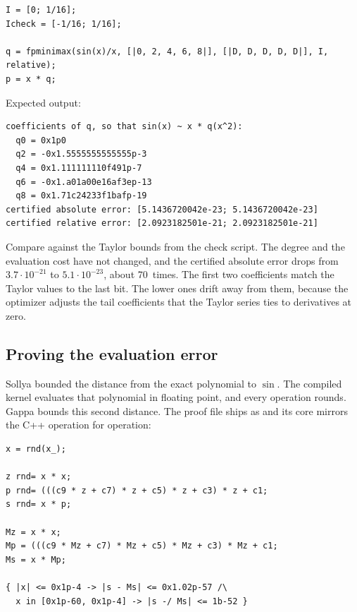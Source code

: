 \documentclass[manuscript, nonacm]{acmart}
\begin{document}
    \begin{lstlisting}[style=sollya]
I = [0; 1/16];
Icheck = [-1/16; 1/16];

q = fpminimax(sin(x)/x, [|0, 2, 4, 6, 8|], [|D, D, D, D, D|], I, relative);
p = x * q;
    \end{lstlisting}

    Expected output:

    \begin{lstlisting}[style=output]
coefficients of q, so that sin(x) ~ x * q(x^2):
  q0 = 0x1p0
  q2 = -0x1.5555555555555p-3
  q4 = 0x1.111111110f491p-7
  q6 = -0x1.a01a00e16af3ep-13
  q8 = 0x1.71c24233f1bafp-19
certified absolute error: [5.1436720042e-23; 5.1436720042e-23]
certified relative error: [2.0923182501e-21; 2.0923182501e-21]
    \end{lstlisting}

    Compare against the Taylor bounds from the check script. The degree and
    the evaluation cost have not changed, and the certified absolute error
    drops from $3.7 \cdot 10^{-21}$ to $5.1 \cdot 10^{-23}$, about 70~times.
    The first two coefficients match the Taylor values to the last bit. The
    lower ones drift away from them, because the optimizer adjusts the tail
    coefficients that the Taylor series ties to derivatives at zero.

    \subsection{Proving the evaluation error}
    \label{sec:sinproof}

    Sollya bounded the distance from the exact polynomial to $\sin$. The
    compiled kernel evaluates that polynomial in floating point, and every
    operation rounds. Gappa bounds this second distance. The proof file
    ships as
     and
    its core mirrors the C++ operation for operation:

    \begin{lstlisting}[style=sollya]
x = rnd(x_);

z rnd= x * x;
p rnd= (((c9 * z + c7) * z + c5) * z + c3) * z + c1;
s rnd= x * p;

Mz = x * x;
Mp = (((c9 * Mz + c7) * Mz + c5) * Mz + c3) * Mz + c1;
Ms = x * Mp;

{ |x| <= 0x1p-4 -> |s - Ms| <= 0x1.02p-57 /\
  x in [0x1p-60, 0x1p-4] -> |s -/ Ms| <= 1b-52 }
    \end{lstlisting}
\end{document}
